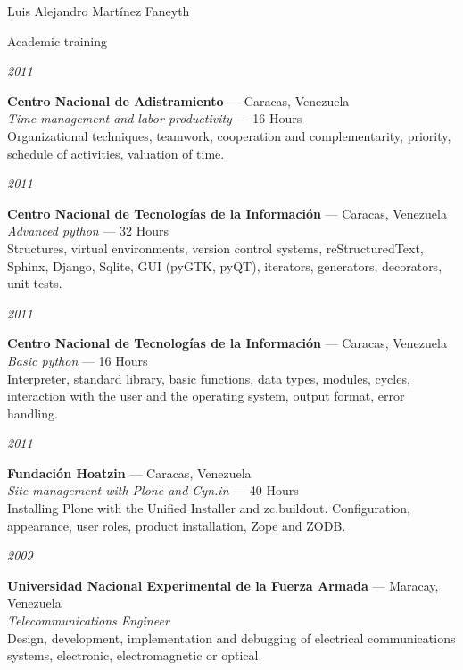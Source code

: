 \documentclass[11pt,letterpaper]{article}
\begin{document}
\begin{cv}{Luis Alejandro Mart\'inez Faneyth}
\begin{cvlist}{Academic training}
\item[{\parbox[t]{6em}{\textit{\large{2011}}}}]{
	\parbox[t]{\linewidth}{
		\textbf{Centro Nacional de Adistramiento} --- Caracas, Venezuela\\
		\textit{Time management and labor productivity} --- 16 Hours\\
		\footnotesize{Organizational techniques, teamwork, cooperation and complementarity, priority, schedule of activities, valuation of time.}
	}
}
\item[{\parbox[t]{6em}{\textit{\large{2011}}}}]{
	\parbox[t]{\linewidth}{
		\textbf{Centro Nacional de Tecnolog\'ias de la Informaci\'on} --- Caracas, Venezuela\\
		\textit{Advanced python} --- 32 Hours\\
		\footnotesize{Structures, virtual environments, version control systems, reStructuredText, Sphinx, Django, Sqlite, GUI (pyGTK, pyQT), iterators, generators, decorators, unit tests.}
	}
}
\item[{\parbox[t]{6em}{\textit{\large{2011}}}}]{
	\parbox[t]{\linewidth}{
		\textbf{Centro Nacional de Tecnolog\'ias de la Informaci\'on} --- Caracas, Venezuela\\
		\textit{Basic python} --- 16 Hours\\
		\footnotesize{Interpreter, standard library, basic functions, data types, modules, cycles, interaction with the user and the operating system, output format, error handling.}
	}
}
\item[{\parbox[t]{6em}{\textit{\large{2011}}}}]{
	\parbox[t]{\linewidth}{
		\textbf{Fundaci\'on Hoatzin} --- Caracas, Venezuela\\
		\textit{Site management with Plone and Cyn.in} --- 40 Hours\\
		\footnotesize{Installing Plone with the Unified Installer and zc.buildout. Configuration, appearance, user roles, product installation, Zope and ZODB.}
	}
}
\item[{\parbox[t]{6em}{\textit{\large{2009}}}}]{
	\parbox[t]{\linewidth}{
		\textbf{Universidad Nacional Experimental de la Fuerza Armada} --- Maracay, Venezuela\\
		\textit{Telecommunications Engineer}\\
		\footnotesize{Design, development, implementation and debugging of electrical communications systems, electronic, electromagnetic or optical.}
	}
}
\end{cvlist}


\end{cv}
\end{document}
